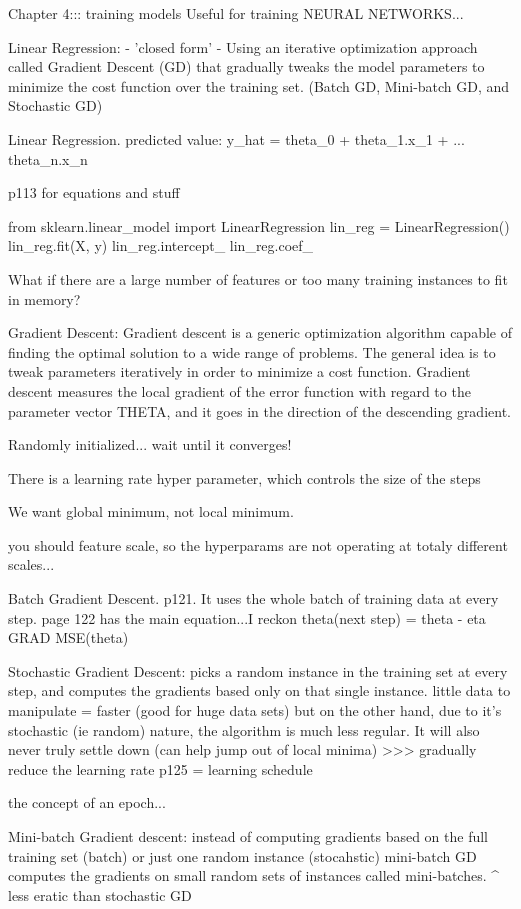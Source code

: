 Chapter 4::: training models
Useful for training NEURAL NETWORKS...

Linear Regression:
- 'closed form'
-
Using an iterative optimization approach called Gradient Descent (GD)
that gradually tweaks the model parameters to minimize the cost function over the training set.
(Batch GD, Mini-batch GD, and Stochastic GD)

Linear Regression.
predicted value: y_hat = theta_0 + theta_1.x_1 + ... theta_n.x_n

p113 for equations and stuff

from sklearn.linear_model import LinearRegression
lin_reg = LinearRegression()
lin_reg.fit(X, y)
lin_reg.intercept_
lin_reg.coef_

What if there are a large number of features
or too many training instances to fit in memory?

Gradient Descent:
Gradient descent is a generic optimization algorithm capable of finding the optimal solution to a wide range of problems. 
The general idea is to tweak parameters iteratively in order to minimize a cost function.
Gradient descent measures the local gradient of the error function with regard to the parameter vector THETA,
and it goes in the direction of the descending gradient.

Randomly initialized... wait until it converges!

There is a learning rate hyper parameter, which controls the size of the steps

We want global minimum, not local minimum.

you should feature scale, so the hyperparams are not operating at totaly different scales...

Batch Gradient Descent. p121.
It uses the whole batch of training data at every step.
page 122 has the main equation...I reckon
theta(next step) = theta - eta GRAD MSE(theta)

Stochastic Gradient Descent:
picks a random instance in the training set at every step,
and computes the gradients based only on that single instance.
little data to manipulate = faster (good for huge data sets)
but on the other hand,
due to it's stochastic (ie random) nature,
the algorithm is much less regular.
It will also never truly settle down (can help jump out of local minima)
>>> gradually reduce the learning rate p125 = learning schedule

the concept of an epoch...

Mini-batch Gradient descent:
instead of computing gradients based on the full training set (batch)
or just one random instance (stocahstic)
mini-batch GD computes the gradients on small random sets of instances called mini-batches.
^ less eratic than stochastic GD

